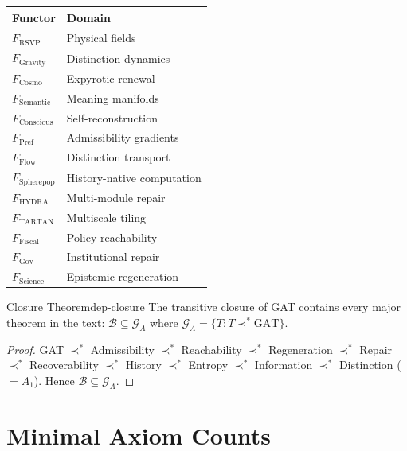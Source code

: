\documentclass[12pt,twoside,openright]{book}
\begin{document}
\begin{center}
\begin{tabular}{ll}
\toprule
Functor & Domain \\
\midrule
$F_\mathrm{RSVP}$ & Physical fields \\
$F_\mathrm{Gravity}$ & Distinction dynamics \\
$F_\mathrm{Cosmo}$ & Expyrotic renewal \\
$F_\mathrm{Semantic}$ & Meaning manifolds \\
$F_\mathrm{Conscious}$ & Self-reconstruction \\
$F_\mathrm{Pref}$ & Admissibility gradients \\
$F_\mathrm{Flow}$ & Distinction transport \\
$F_\mathrm{Spherepop}$ & History-native computation \\
$F_\mathrm{HYDRA}$ & Multi-module repair \\
$F_\mathrm{TARTAN}$ & Multiscale tiling \\
$F_\mathrm{Fiscal}$ & Policy reachability \\
$F_\mathrm{Gov}$ & Institutional repair \\
$F_\mathrm{Science}$ & Epistemic regeneration \\
\bottomrule
\end{tabular}
\end{center}

\begin{theorem}{Closure Theorem}{dep-closure}
  The transitive closure of GAT contains every major
  theorem in the text: $\mathcal{B} \subseteq \mathcal{G}_A$
  where $\mathcal{G}_A = \{T : T \prec^* \text{GAT}\}$.
\end{theorem}

\begin{proof}
  GAT $\prec^*$ Admissibility $\prec^*$ Reachability
  $\prec^*$ Regeneration $\prec^*$ Repair
  $\prec^*$ Recoverability $\prec^*$ History
  $\prec^*$ Entropy $\prec^*$ Information
  $\prec^*$ Distinction ($= A_1$).
  Hence $\mathcal{B} \subseteq \mathcal{G}_A$.
\end{proof}

\section{Minimal Axiom Counts}
\end{document}
